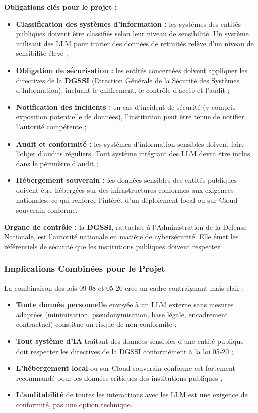 \documentclass[12pt, a4paper]{report}
\begin{document}
\textbf{Obligations clés pour le projet :}
\begin{itemize}
  \item \textbf{Classification des systèmes d'information :} les
        systèmes des entités publiques doivent être classifiés selon
        leur niveau de sensibilité. Un système utilisant des LLM pour
        traiter des données de retraités relève d'un niveau de
        sensibilité élevé ;
  \item \textbf{Obligation de sécurisation :} les entités concernées
        doivent appliquer les directives de la \textbf{DGSSI} (Direction
        Générale de la Sécurité des Systèmes d'Information), incluant
        le chiffrement, le contrôle d'accès et l'audit ;
  \item \textbf{Notification des incidents :} en cas d'incident de
        sécurité (y compris exposition potentielle de données),
        l'institution peut être tenue de notifier l'autorité compétente ;
  \item \textbf{Audit et conformité :} les systèmes d'information
        sensibles doivent faire l'objet d'audits réguliers. Tout
        système intégrant des LLM devra être inclus dans le périmètre
        d'audit ;
  \item \textbf{Hébergement souverain :} les données sensibles des
        entités publiques doivent être hébergées sur des infrastructures
        conformes aux exigences nationales, ce qui renforce l'intérêt
        d'un déploiement local ou sur Cloud souverain conforme.
\end{itemize}

\textbf{Organe de contrôle :} la \textbf{DGSSI}, rattachée à
l'Administration de la Défense Nationale, est l'autorité nationale en
matière de cybersécurité. Elle émet les référentiels de sécurité que les
institutions publiques doivent respecter.

\subsubsection{Implications Combinées pour le Projet}

La combinaison des lois 09-08 et 05-20 crée un cadre contraignant mais
clair :

\begin{itemize}
  \item \textbf{Toute donnée personnelle} envoyée à un LLM externe sans
        mesures adaptées (minimisation, pseudonymisation, base légale,
        encadrement contractuel) constitue un risque de non-conformité ;
  \item \textbf{Tout système d'IA} traitant des données sensibles d'une
        entité publique doit respecter les directives de la DGSSI
        conformément à la loi 05-20 ;
  \item \textbf{L'hébergement local} ou sur Cloud souverain conforme est
        fortement recommandé pour les données critiques des institutions
        publiques ;
  \item \textbf{L'auditabilité} de toutes les interactions avec les LLM
        est une exigence de conformité, pas une option technique.
\end{itemize}
\end{document}
